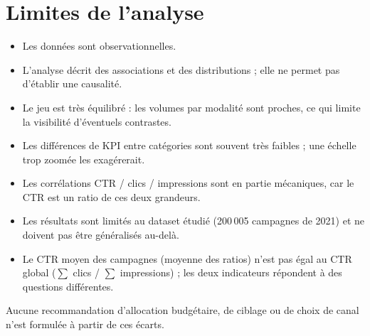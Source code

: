\chapter{Limites de l'analyse}
\label{chap:limites}

\begin{constraints}
\begin{itemize}
\item Les données sont observationnelles.
\item L'analyse décrit des associations et des distributions ; elle ne permet pas d'établir une causalité.
\item Le jeu est très équilibré : les volumes par modalité sont proches, ce qui limite la visibilité d'éventuels contrastes.
\item Les différences de KPI entre catégories sont souvent très faibles ; une échelle trop zoomée les exagérerait.
\item Les corrélations CTR / clics / impressions sont en partie mécaniques, car le CTR est un ratio de ces deux grandeurs.
\item Les résultats sont limités au dataset étudié (200\,005 campagnes de 2021) et ne doivent pas être généralisés au-delà.
\item Le CTR moyen des campagnes (moyenne des ratios) n'est pas égal au CTR global ($\sum$ clics / $\sum$ impressions) ; les deux indicateurs répondent à des questions différentes.
\end{itemize}
\end{constraints}

Aucune recommandation d'allocation budgétaire, de ciblage ou de choix de canal n'est formulée à partir de ces écarts.
